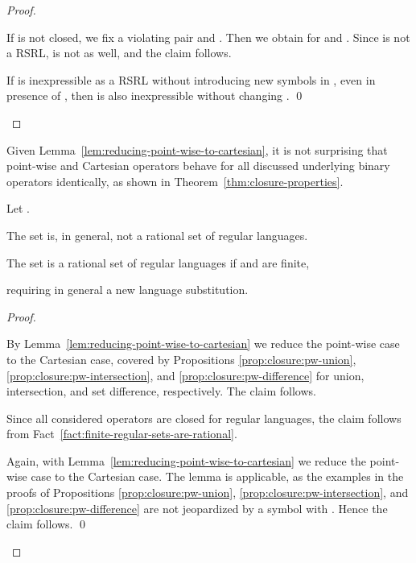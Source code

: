 \documentclass[envcountsame]{llncs}
\newcommand{\RegularlyGeneratedLanguageSet}{rational set of regular languages\xspace}
\newcommand{\RegularlyGeneratedLanguageSetAbbrev}{RSRL\xspace}
\begin{document}
\begin{proof}
  \begin{inparaenum}[\bfseries(1)]
  \item If  is not closed, we fix a violating
    pair  and .
Then we obtain
      for
     and .
Since  is not a \RegularlyGeneratedLanguageSetAbbrev,
     is not as well, and the
    claim follows.
\item If  is inexpressible as a \RegularlyGeneratedLanguageSetAbbrev
    without introducing new symbols in , even in presence of
    , then  is also
    inexpressible without changing .  
\qed
  \end{inparaenum}
\end{proof}


Given Lemma~\ref{lem:reducing-point-wise-to-cartesian}, it is not
surprising that point-wise and Cartesian operators behave for all
discussed underlying binary operators identically, as shown in Theorem~\ref{thm:closure-properties}.


\begin{corollary}
  \label{cor:catesian-binary}
  Let .
  \begin{inparaenum}
  \item The set  is, in
    general, not a \RegularlyGeneratedLanguageSet.
  \item The set  is a
    \RegularlyGeneratedLanguageSet if  and  are finite,
  \item requiring in general a new language substitution.
  \end{inparaenum}
\end{corollary}

\begin{proof}
  \begin{inparaenum}[\bfseries(1)]
  \item By Lemma~\ref{lem:reducing-point-wise-to-cartesian} we reduce
    the point-wise case to the Cartesian case, covered by Propositions
    \ref{prop:closure:pw-union}, \ref{prop:closure:pw-intersection},
    and \ref{prop:closure:pw-difference} for union, intersection, and
    set difference, respectively.
The claim follows.
  \item Since all considered operators are closed for regular
    languages, the claim follows from
    Fact~\ref{fact:finite-regular-sets-are-rational}.
  \item Again, with Lemma~\ref{lem:reducing-point-wise-to-cartesian}
    we reduce the point-wise case to the Cartesian case.
The lemma is applicable, as the examples in the proofs of
    Propositions \ref{prop:closure:pw-union},
    \ref{prop:closure:pw-intersection}, and
    \ref{prop:closure:pw-difference} are not jeopardized by a symbol
     with .
Hence the claim follows. \qed
  \end{inparaenum}
\end{proof}
\end{document}
